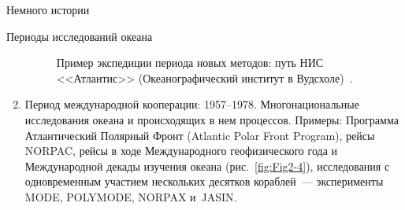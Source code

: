 \begin{chapter}{Немного истории}
\begin{section}{Периоды исследований океана}
\begin{enumerate}
\begin{figure}[t!]
\caption{Пример экспедиции периода новых методов: путь НИС <<Атлантис>>
(Океанографический институт в Вудсхоле)~\cite{Wust:1964}.}
\label{fig:Fig2-3}
\end{figure}
%
% 

\item
Период международной кооперации: 1957--1978.
Многонациональные исследования океана и происходящих в нем процессов.
Примеры: Программа Атлантический Полярный Фронт
(Atlantic Polar Front Program), рейсы NORPAC, рейсы в ходе
Международного геофизического года и Международной декады изучения
океана (рис.~\ref{fig:Fig2-4}), исследования с одновременным участием 
нескольких десятков кораблей~--- эксперименты MODE, POLYMODE, NORPAX и~JASIN.
%


\end{enumerate}
\end{section}
\end{chapter}
